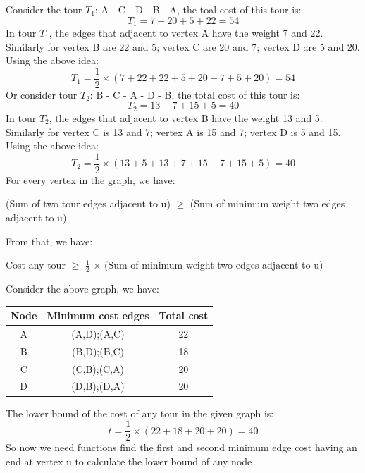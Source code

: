 \documentclass[a4paper]{article}
\begin{document}
Consider the tour $T_1$: A - C - D - B - A, the toal cost of this tour is:
\begin{equation*}
    T_1 = 7 + 20 + 5 + 22 = 54
\end{equation*}
In tour $T_1$, the edges that adjacent to vertex A have the weight 7 and 22. Similarly for vertex B are 22 and 5; vertex C are 20 and 7; vertex D are 5 and 20. Using the above idea:
\begin{equation*}
    T_1 = \frac{1}{2} \times (7 + 22 + 22 + 5 + 20 + 7 + 5 + 20) = 54
\end{equation*}
Or consider tour $T_2$: B - C - A - D - B, the total cost of this tour is: 
\begin{equation*}
    T_2 = 13 + 7 + 15 + 5 = 40
\end{equation*}
In tour $T_2$, the edges that adjacent to vertex B have the weight 13 and 5. Similarly for vertex C is 13 and 7; vertex A is 15 and 7; vertex D is 5 and 15. Using the above idea:
\begin{equation*}
    T_2 = \frac{1}{2} \times (13 + 5 + 13 + 7 + 15 + 7 + 15 + 5) = 40
\end{equation*}
For every vertex in the graph, we have:
\begin{center}
    (Sum of two tour edges adjacent to u) $\geqslant$ (Sum of minimum weight two edges adjacent to u)   
\end{center}
From that, we have:
\begin{center}
    Cost any tour $\geqslant$ $\frac{1}{2}$ $\times$  (Sum of minimum weight two edges adjacent to u)
\end{center}
Consider the above graph, we have:
\begin{center}
    \begin{tabular}{|c|c|c|}
        \hline
        Node & Minimum cost edges & Total cost\\
        \hline
        A & (A,D);(A,C) & 22 \\
        \hline
        B & (B,D);(B,C) & 18 \\
        \hline
        C & (C,B);(C,A) & 20 \\
        \hline
        D & (D,B);(D,A) & 20 \\
        \hline
    \end{tabular}
\end{center}
The lower bound of the cost of any tour in the given graph is:
\begin{equation*}
    t = \frac{1}{2} \times (22 + 18 + 20 + 20) = 40
\end{equation*} 
So now we need functions find the first and second minimum edge cost having an end at vertex u to calculate the lower bound of any node
\end{document}
